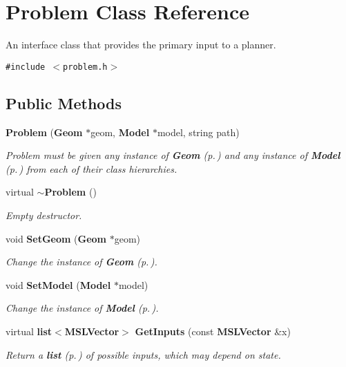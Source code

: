 \section{Problem  Class Reference}
\label{classProblem}
An interface class that provides the primary input to a planner. 


{\tt \#include $<$problem.h$>$}

\subsection*{Public Methods}
\begin{CompactItemize}
\item 
{\bf Problem} ({\bf Geom} $\ast$geom, {\bf Model} $\ast$model, string path)
\begin{CompactList}\small\item\em Problem must be given any instance of {\bf Geom} {\rm (p.\,\pageref{classGeom})} and any instance of {\bf Model} {\rm (p.\,\pageref{classModel})} from each of their class hierarchies.\item\end{CompactList}\item 
virtual {\bf $\sim$Problem} ()
\begin{CompactList}\small\item\em Empty destructor.\item\end{CompactList}\item 
void {\bf Set\-Geom} ({\bf Geom} $\ast$geom)
\begin{CompactList}\small\item\em Change the instance of {\bf Geom} {\rm (p.\,\pageref{classGeom})}.\item\end{CompactList}\item 
void {\bf Set\-Model} ({\bf Model} $\ast$model)
\begin{CompactList}\small\item\em Change the instance of {\bf Model} {\rm (p.\,\pageref{classModel})}.\item\end{CompactList}\item 
virtual {\bf list}$<${\bf MSLVector}$>$ {\bf Get\-Inputs} (const {\bf MSLVector} \&x)
\begin{CompactList}\small\item\em Return a {\bf list} {\rm (p.\,\pageref{classlist})} of possible inputs, which may depend on state.\item\end{CompactList}\item 

\end{CompactItemize}
